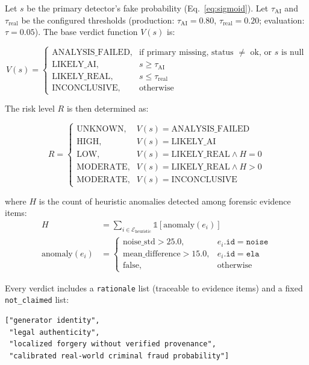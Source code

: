 \documentclass[10pt,conference,compsoc]{IEEEtran}
\begin{document}
Let $s$ be the primary detector's fake probability (Eq.~\ref{eq:sigmoid}).
Let $\tau_{\mathrm{AI}}$ and $\tau_{\mathrm{real}}$ be the configured thresholds (production: $\tau_{\mathrm{AI}}=0.80$, $\tau_{\mathrm{real}}=0.20$; evaluation: $\tau=0.05$).
The base verdict function $V(s)$ is:

\begin{equation}
V(s) =
\begin{cases}
\text{ANALYSIS\_FAILED}, & \text{if primary missing, status $\neq$ ok, or $s$ is null} \\
\text{LIKELY\_AI}, & s \ge \tau_{\mathrm{AI}} \\
\text{LIKELY\_REAL}, & s \le \tau_{\mathrm{real}} \\
\text{INCONCLUSIVE}, & \text{otherwise}
\end{cases}
\label{eq:verdict}
\end{equation}

The risk level $R$ is then determined as:

\begin{equation}
R =
\begin{cases}
\text{UNKNOWN}, & V(s) = \text{ANALYSIS\_FAILED} \\
\text{HIGH}, & V(s) = \text{LIKELY\_AI} \\
\text{LOW}, & V(s) = \text{LIKELY\_REAL} \land H = 0 \\
\text{MODERATE}, & V(s) = \text{LIKELY\_REAL} \land H > 0 \\
\text{MODERATE}, & V(s) = \text{INCONCLUSIVE}
\end{cases}
\label{eq:risk}
\end{equation}

where $H$ is the count of heuristic anomalies detected among forensic evidence items:
\begin{align}
H &= \sum_{i \in \mathcal{E}_{\mathrm{heuristic}}} \mathbb{1}[\text{anomaly}(e_i)] \\
\text{anomaly}(e_i) &=
\begin{cases}
\text{noise\_std} > 25.0, & e_i.\texttt{id} = \texttt{noise} \\
\text{mean\_difference} > 15.0, & e_i.\texttt{id} = \texttt{ela} \\
\text{false}, & \text{otherwise}
\end{cases}
\label{eq:heuristic-anomaly}
\end{align}

Every verdict includes a \texttt{rationale} list (traceable to evidence items) and a fixed \texttt{not\_claimed} list:
\begin{verbatim}
["generator identity",
 "legal authenticity",
 "localized forgery without verified provenance",
 "calibrated real-world criminal fraud probability"]
\end{verbatim}
\end{document}
